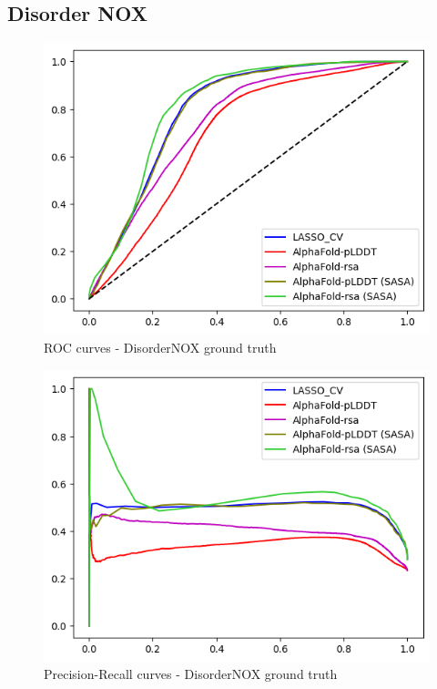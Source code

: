 \pagebreak

\subsection{Disorder NOX}

\begin{figure}[h!]
    \centering
    \includegraphics[scale = 0.8]{res/ML/roc-disordernox.png}
    \caption{ROC curves - DisorderNOX ground truth}
\end{figure}



\begin{figure}[h!]
    \centering
    \includegraphics[scale = 0.8]{res/ML/precisionrecall-disordernox.png}
    \caption{Precision-Recall curves - DisorderNOX ground truth}
\end{figure}

